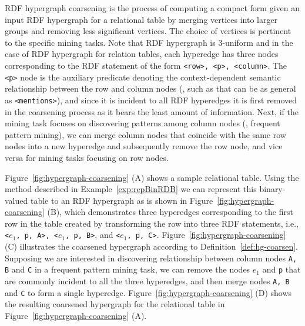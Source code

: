 \begin{mydef}
\label{def:hg-coarsen}
RDF hypergraph coarsening is the process of computing a compact form given an input RDF hypergraph for a relational table by merging vertices into larger groups and removing less significant vertices. The choice of vertices is pertinent to the specific mining tasks. Note that RDF hypergraph is 3-uniform and in the case of RDF hypergraph for relation tables, each hyperedge has three nodes corresponding to the RDF statement of the form \texttt{<row>, <p>, <column>}. The \texttt{<p>} node is the auxiliary predicate denoting the context-dependent semantic relationship between the row and column nodes (\eg, such as that can be as general as \texttt{<mentions>}), and since it is incident to all RDF hyperedges it is first removed in the coarsening process as it bears the least amount of information. Next, if the mining task focuses on discovering patterns among column nodes (\eg, frequent pattern mining), we can merge column nodes that coincide with the same row nodes into a new hyperedge and subsequently remove the row node, and vice versa for mining tasks focusing on row nodes.
\end{mydef}

\begin{myexp}
\label{column-wise-hg}
Figure~\ref{fig:hypergraph-coarsening} (A) shows a sample relational table. Using the method described in Example~\ref{exp:repBinRDB} we can represent this binary-valued table to an RDF hypergraph as is shown in Figure~\ref{fig:hypergraph-coarsening} (B), which demonstrates three hyperedges corresponding to the first row in the table created by transforming the row into three RDF statements, i.e., \texttt{<$e_1$, p, A>, <$e_1$, p, B>}, and \texttt{<$e_1$, p, C>}. Figure~\ref{fig:hypergraph-coarsening} (C) illustrates the coarsened hypergraph according to Definition~\ref{def:hg-coarsen}. Supposing we are interested in discovering relationship between column nodes \texttt{A, B} and \texttt{C} in a frequent pattern mining task, we can remove the nodes \texttt{$e_1$} and \texttt{p} that are commonly incident to all the three hyperedges, and then merge nodes \texttt{A, B} and \texttt{C} to form a single hyperedge. Figure~\ref{fig:hypergraph-coarsening} (D) shows the resulting coarsened hypergraph for the relational table in Figure~\ref{fig:hypergraph-coarsening} (A).
\end{myexp}

